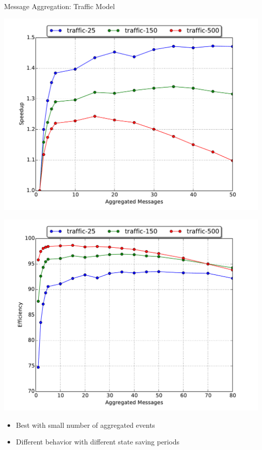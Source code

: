 \documentclass[10pt]{beamer}
\begin{document}
\begin{frame}{Message Aggregation: Traffic Model}
    \begin{minipage}{0.5\textwidth}
        \centerline{\includegraphics[width=1.1\textwidth]{../figs/partitioning_communication/aggregate_traffic_speedup.pdf}}
    \end{minipage}%
    \begin{minipage}{0.5\textwidth}
        \centerline{\includegraphics[width=1.1\textwidth]{../figs/partitioning_communication/aggregate_traffic_efficiency.pdf}}
    \end{minipage}
    \bigskip
    \begin{itemize}
        \item Best with small number of aggregated events
        \item Different behavior with different state saving periods
    \end{itemize}
\end{frame}
\end{document}
